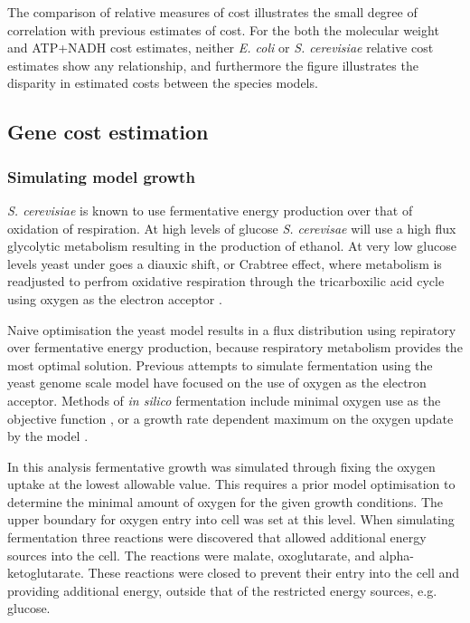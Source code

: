 The comparison of relative measures of cost illustrates the small degree of correlation with previous estimates of cost. For the both the molecular weight and ATP+NADH cost estimates, neither \emph{E. coli} or \emph{S. cerevisiae} relative cost estimates show any relationship, and furthermore the figure illustrates the disparity in estimated costs between the species models.

\subsection{Gene cost estimation}

\subsubsection{Simulating model growth}

\emph{S. cerevisiae} is known to use fermentative energy production over that of oxidation of respiration. At high levels of glucose \emph{S. cerevisae} will use a high flux glycolytic metabolism resulting in the production of ethanol. At very low glucose levels yeast under goes a diauxic shift, or Crabtree effect, where metabolism is readjusted to perfrom oxidative respiration through the tricarboxilic acid cycle using oxygen as the electron acceptor \cite{kolkman2005,kolkman2006}.

Naive optimisation the yeast model results in a flux distribution using repiratory over fermentative energy production, because respiratory metabolism provides the most optimal solution. Previous attempts to simulate fermentation using the yeast genome scale model have focused on the use of oxygen as the electron acceptor. Methods of \emph{in silico} fermentation include minimal oxygen use as the objective function \cite{cakir2007}, or a growth rate dependent maximum on the oxygen update by the model \cite{famili2003}.

In this analysis fermentative growth was simulated through fixing the oxygen uptake at the lowest allowable value. This requires a prior model optimisation to determine the minimal amount of oxygen for the given growth conditions. The upper boundary for oxygen entry into cell was set at this level. When simulating fermentation three reactions were discovered that allowed additional energy sources into the cell. The reactions were malate, oxoglutarate, and alpha-ketoglutarate. These reactions were closed to prevent their entry into the cell and providing additional energy, outside that of the restricted energy sources, e.g. glucose.

